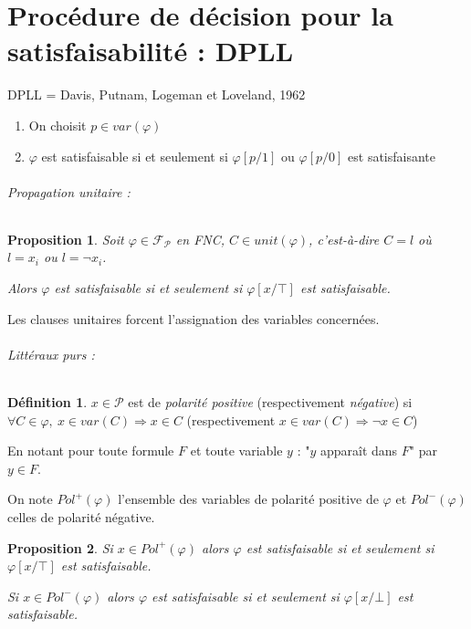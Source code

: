 \documentclass[]{article}
\newtheorem{myproposition}{Proposition}
\theoremstyle{remark}
\theoremstyle{definition}
\newtheorem{mydef}{Définition}
\begin{document}
\part{Procédure de décision pour la satisfaisabilité : DPLL}

DPLL = Davis, Putnam, Logeman et Loveland, 1962

\begin{enumerate}
	\item On choisit $p \in var(\varphi)$
	\item $\varphi$ est satisfaisable si et seulement si $\varphi[p/1]$ ou $\varphi[p/0]$ est satisfaisante
\end{enumerate}

\paragraph{Propagation unitaire :}

\begin{myproposition}

	Soit $\varphi \in \mathcal{F}_{\mathcal{P}}$ en FNC, $C \in unit(\varphi)$, c'est-à-dire $C = l$ où $l = x_i$ ou $l = \neg x_i$.
	
	Alors $\varphi$ est satisfaisable si et seulement si $\varphi[x/\top]$ est satisfaisable.
\end{myproposition}

Les clauses unitaires forcent l'assignation des variables concernées.

\paragraph{Littéraux purs :}

\begin{mydef}
	$x \in \mathcal{P}$ est de \textit{polarité positive} (respectivement \textit{négative}) si $\forall C \in \varphi, ~ x \in var(C) \Longrightarrow x \in C$ (respectivement $x \in var(C) \Longrightarrow \neg x \in C$)
\end{mydef}

En notant pour toute formule $F$ et toute variable $y$ : "$y$ apparaît dans $F$" par $y \in F$.

On note $Pol^+(\varphi)$ l'ensemble des variables de polarité positive de $\varphi$ et $Pol^-(\varphi)$ celles de polarité négative.

\begin{myproposition}
	Si $x \in Pol^+(\varphi)$ alors $\varphi$ est satisfaisable si et seulement si $\varphi[x/\top]$ est satisfaisable.
	
	Si $x \in Pol^-(\varphi)$ alors $\varphi$ est satisfaisable si et seulement si $\varphi[x/\bot]$ est satisfaisable.
\end{myproposition}
\end{document}
